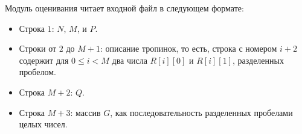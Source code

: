 Модуль оценивания читает входной файл в следующем формате: 
\begin{itemize}
\item Строка $1$: $N$, $M$, и $P$. 
\item Строки от $2$ до $M+1$: описание тропинок, то есть, строка с номером $i+2$ содержит для $0 \le i < M$ два числа $R[i][0]$ и $R[i][1]$, разделенных пробелом. 
\item Строка $M+2$: $Q$. 
\item Строка $M+3$: массив $G$, как последовательность разделенных пробелами целых чисел. 
\end{itemize}
